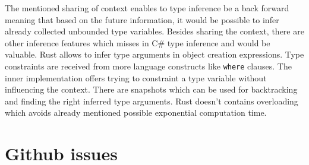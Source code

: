 \par
{}
The mentioned sharing of context enables to type inference be a back forward meaning that based on the future information, it would be possible to infer already collected unbounded type variables.
Besides sharing the context, there are other inference features which misses in C\# type inference and would be valuable.
Rust allows to infer type arguments in object creation expressions.
Type constraints are received from more language constructs like \texttt{where} clauses.
The inner implementation offers trying to constraint a type variable without influencing the context.
There are snapshots which can be used for backtracking and finding the right inferred type arguments.
Rust doesn't contains overloading which avoids already mentioned possible exponential computation time.

\section{Github issues}

